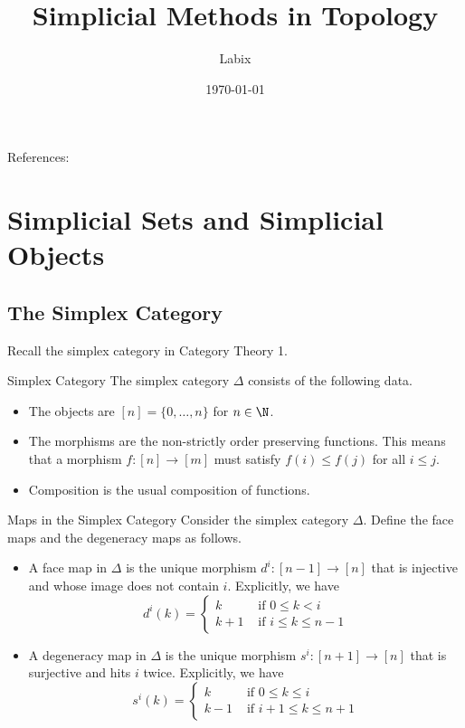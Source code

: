 \documentclass[a4paper]{article}
\title{Simplicial Methods in Topology}
\author{Labix}
\date{\today}
\begin{document}
\maketitle
\begin{abstract}

\end{abstract}
References: 

\pagebreak
\tableofcontents

\pagebreak

\section{Simplicial Sets and Simplicial Objects}
\subsection{The Simplex Category}
Recall the simplex category in Category Theory 1. 

\begin{defn}{Simplex Category}{} The simplex category $\Delta$ consists of the following data. 
\begin{itemize}
\item The objects are $[n]=\{0,\dots,n\}$ for $n\in\N$. 
\item The morphisms are the non-strictly order preserving functions. This means that a morphism $f:[n]\to[m]$ must satisfy $f(i)\leq f(j)$ for all $i\leq j$. 
\item Composition is the usual composition of functions. 
\end{itemize}
\end{defn}

\begin{defn}{Maps in the Simplex Category}{} Consider the simplex category $\Delta$. Define the face maps and the degeneracy maps as follows. 
\begin{itemize}
\item A face map in $\Delta$ is the unique morphism $d^i:[n-1]\to[n]$ that is injective and whose image does not contain $i$. Explicitly, we have $$d^i(k)=\begin{cases}
k & \text{ if } 0\leq k <i\\
k+1 & \text{ if } i\leq k\leq n-1
\end{cases}$$
\item A degeneracy map in $\Delta$ is the unique morphism $s^i:[n+1]\to[n]$ that is surjective and hits $i$ twice. Explicitly, we have $$s^i(k)=\begin{cases}
k & \text{ if } 0\leq k\leq i\\
k-1 & \text{ if } i+1\leq k\leq n+1
\end{cases}$$
\end{itemize}
\end{defn}
\end{document}
